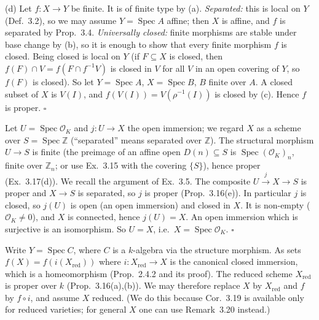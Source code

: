 \documentclass[11pt]{article}
\begin{document}
(d) Let $f:X\to Y$ be finite. It is of finite type by (a). \emph{Separated:} this is local on $Y$ (Def.~3.2), so we may assume $Y=\operatorname{Spec}A$ affine; then $X$ is affine, and $f$ is separated by Prop.~3.4. \emph{Universally closed:} finite morphisms are stable under base change by (b), so it is enough to show that every finite morphism $f$ is closed. Being closed is local on $Y$ (if $F\subseteq X$ is closed, then $f(F)\cap V=f(F\cap f^{-1}V)$ is closed in $V$ for all $V$ in an open covering of $Y$, so $f(F)$ is closed). So let $Y=\operatorname{Spec}A$, $X=\operatorname{Spec}B$, $B$ finite over $A$. A closed subset of $X$ is $V(I)$, and $f(V(I))=V(\rho^{-1}(I))$ is closed by (c). Hence $f$ is proper. \hfill$\square$

\pf
Let $U=\operatorname{Spec}\mathcal{O}_K$ and $j:U\to X$ the open immersion; we regard $X$ as a scheme over $S=\operatorname{Spec}\mathbb{Z}$ (``separated'' means separated over $\mathbb{Z}$). The structural morphism $U\to S$ is finite (the preimage of an affine open $D(n)\subseteq S$ is $\operatorname{Spec}(\mathcal{O}_K)_n$, finite over $\mathbb{Z}_n$; or use Ex.~3.15 with the covering $\{S\}$), hence proper (Ex.~3.17(d)). We recall the argument of Ex.~3.5. The composite $U\xrightarrow{j}X\to S$ is proper and $X\to S$ is separated, so $j$ is proper (Prop.~3.16(e)). In particular $j$ is closed, so $j(U)$ is open (an open immersion) and closed in $X$. It is non-empty ($\mathcal{O}_K\neq0$), and $X$ is connected, hence $j(U)=X$. An open immersion which is surjective is an isomorphism. So $U=X$, i.e.\ $X=\operatorname{Spec}\mathcal{O}_K$. \hfill$\square$

\pf
Write $Y=\operatorname{Spec}C$, where $C$ is a $k$-algebra via the structure morphism. As sets $f(X)=f(i(X_{\mathrm{red}}))$ where $i:X_{\mathrm{red}}\to X$ is the canonical closed immersion, which is a homeomorphism (Prop.~2.4.2 and its proof). The reduced scheme $X_{\mathrm{red}}$ is proper over $k$ (Prop.~3.16(a),(b)). We may therefore replace $X$ by $X_{\mathrm{red}}$ and $f$ by $f\circ i$, and assume $X$ reduced. (We do this because Cor.~3.19 is available only for reduced varieties; for general $X$ one can use Remark~3.20 instead.)
\end{document}
